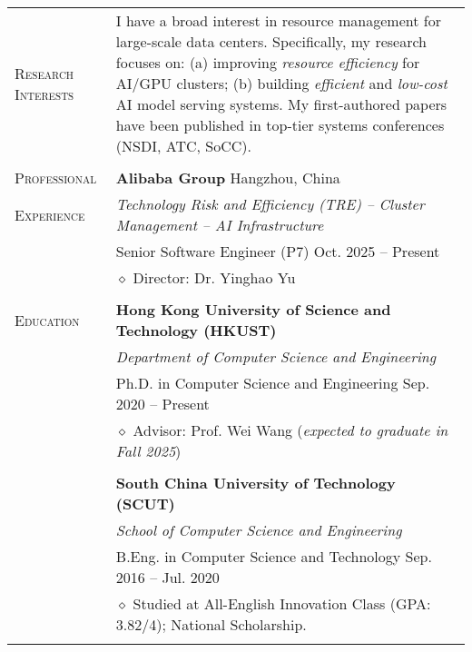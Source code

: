 \documentclass[letterpaper, 12pt]{article}
\begin{document}
\begin{longtable}{p{1.0in}p{5.8in}}


\nohyphens{\textsc{Research Interests}}
& I have a broad interest in resource management for large-scale data centers.
Specifically, my research focuses on: (a) improving \textit{resource efficiency} for AI/GPU clusters; (b) building \textit{efficient} and \textit{low-cost} AI model serving systems.
My first-authored papers have been published in top-tier systems conferences (NSDI, ATC, SoCC).
\\
& \\

{\textsc{Professional}}
& {\textbf{Alibaba Group}} \hfill Hangzhou, China \\
{\textsc{Experience}}
& \textit{Technology Risk and Efficiency (TRE) -- Cluster Management -- AI Infrastructure} \\
& Senior Software Engineer (P7) \hfill Oct. 2025 -- Present \\
& $\diamond$ Director: Dr. Yinghao Yu \\
& \\

{\textsc{Education}}
& \textbf{Hong Kong University of Science and Technology (HKUST)} \\
& \textit{Department of Computer Science and Engineering} \\
& Ph.D. in Computer Science and Engineering \hfill Sep. 2020 -- Present \\
& $\diamond$ Advisor: Prof. Wei Wang \hfill (\textit{expected to graduate in Fall 2025}) \\
& \\

& \textbf{South China University of Technology (SCUT)} \\
& \textit{School of Computer Science and Engineering} \\
& B.Eng. in Computer Science and Technology \hfill Sep. 2016 -- Jul. 2020 \\
& $\diamond$ Studied at All-English Innovation Class (GPA: 3.82/4); National Scholarship. \\
& \\


\end{longtable}
\end{document}
